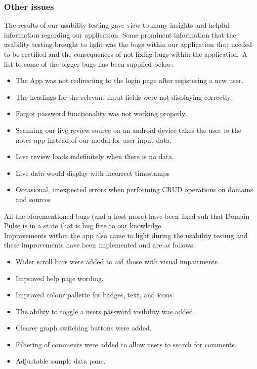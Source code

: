 \documentclass[12pt]{article}
\begin{document}
\subsubsection{Other issues}
The results of our usability testing gave view to many insights and helpful information regarding our application. Some prominent information that the usability testing brought to light was the bugs within our application that needed to be rectified and the consequences of not fixing bugs within the application.
A list to some of the bigger bugs has been supplied below:
\begin{itemize}
    \item The App was not redirecting to the login page after registering a new user.
    \item The headings for the relevant input fields were not displaying correctly.
    \item Forgot password functionality was not working properly.
    \item Scanning our live review source on an android device takes the user to the notes app instead of our modal for user input data.
    \item Live review loads indefinitely when there is no data.
    \item Live data would display with incorrect timestamps
    \item Occasional, unexpected errors when performing CRUD operations on domains and sources
\end{itemize}
All the aforementioned bugs (and a host more) have been fixed suh that Domain Pulse is in a state that is bug free to our knowledge.
\\
Improvements within the app also came to light during the usability testing and these improvements have been implemented and are as follows:
\begin{itemize}
    \item Wider scroll bars were added to aid those with visual impairments.
    \item Improved help page wording.
    \item Improved colour pallette for badges, text, and icons.
    \item The ability to toggle a users password visibility was added.
    \item Clearer graph switching buttons were added.
    \item Filtering of comments were added to allow users to search for comments.
    \item Adjustable sample data pane.
\end{itemize}
\end{document}
